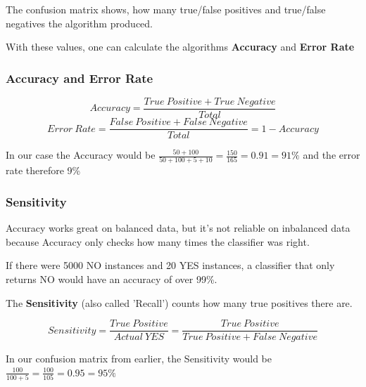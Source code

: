\documentclass[a4paper, 11pt]{article}
\begin{document}
\vspace{10px}

The confusion matrix shows, how many true/false positives and true/false negatives the algorithm produced. 

With these values, one can calculate the algorithms \textbf{Accuracy} and \textbf{Error Rate}

\subsubsection{Accuracy and Error Rate}

\begin{equation}
	Accuracy = \frac{True\ Positive + True\ Negative}{Total}
\end{equation}
\vspace{10px}
\begin{equation}
	Error\ Rate = \frac{False\ Positive + False\ Negative}{Total} = 1 - Accuracy
\end{equation}

\vspace{10px}

In our case the Accuracy would be $\frac{50+100}{50+100+5+10} = \frac{150}{165} = 0.91 = 91\%$ and the error rate therefore 9\%

\newpage

\subsubsection{Sensitivity}

Accuracy works great on balanced data, but it's not reliable on inbalanced data because Accuracy only checks how many times the classifier was right. 

If there were 5000 NO instances and 20 YES instances, a classifier that only returns NO would have an accuracy of over 99\%.

\vspace{10px}

\noindent The \textbf{Sensitivity} (also called 'Recall') counts how many true positives there are.

\begin{equation}
	Sensitivity = \frac{True\ Positive}{Actual\ YES} = \frac{True\ Positive}{True\ Positive + False\ Negative} 
\end{equation}

\vspace{10px}

In our confusion matrix from earlier, the Sensitivity would be $\frac{100}{100 + 5} = \frac{100}{105} = 0.95 = 95\%$
\end{document}
